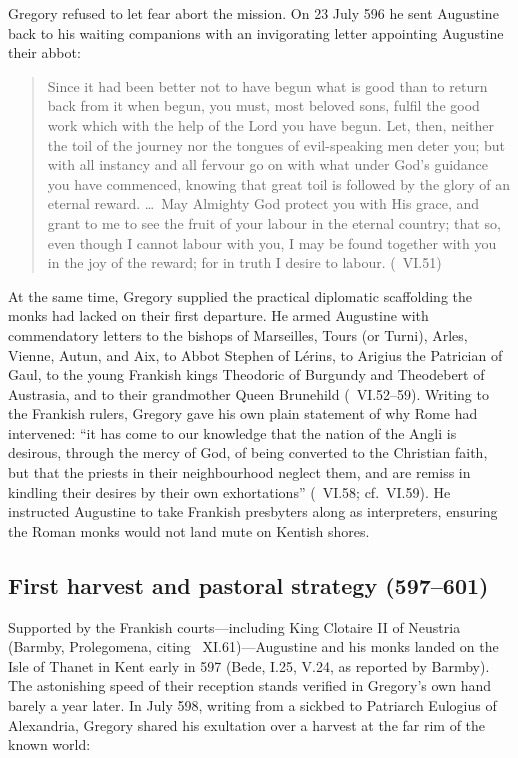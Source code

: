 Gregory refused to let fear abort the mission. On 23 July 596 he sent Augustine
back to his waiting companions with an invigorating letter appointing Augustine
their abbot:

\begin{quote}
Since it had been better not to have begun what is good than to return back
from it when begun, you must, most beloved sons, fulfil the good work which
with the help of the Lord you have begun. Let, then, neither the toil of the
journey nor the tongues of evil-speaking men deter you; but with all instancy
and all fervour go on with what under God's guidance you have commenced,
knowing that great toil is followed by the glory of an eternal reward. \dots\
May Almighty God protect you with His grace, and grant to me to see the fruit of
your labour in the eternal country; that so, even though I cannot labour with
you, I may be found together with you in the joy of the reward; for in truth I
desire to labour. (\work{Ep.}\ VI.51)
\end{quote}

At the same time, Gregory supplied the practical diplomatic scaffolding the
monks had lacked on their first departure. He armed Augustine with commendatory
letters to the bishops of Marseilles, Tours (or Turni), Arles, Vienne, Autun,
and Aix, to Abbot Stephen of L\'erins, to Arigius the Patrician of Gaul, to
the young Frankish kings Theodoric of Burgundy and Theodebert of Austrasia,
and to their grandmother Queen Brunehild (\work{Ep.}\ VI.52--59). Writing to
the Frankish rulers, Gregory gave his own plain statement of why Rome had
intervened: ``it has come to our knowledge that the nation of the Angli is
desirous, through the mercy of God, of being converted to the Christian faith,
but that the priests in their neighbourhood neglect them, and are remiss in
kindling their desires by their own exhortations'' (\work{Ep.}\ VI.58; cf.\
VI.59). He instructed Augustine to take Frankish presbyters along as
interpreters, ensuring the Roman monks would not land mute on Kentish shores.

\subsection{First harvest and pastoral strategy (597--601)}

Supported by the Frankish courts---including King Clotaire II of Neustria
(Barmby, Prolegomena, citing \ XI.61)---Augustine and his monks
landed on the Isle of Thanet in Kent early in 597 (Bede, \work{Historia
Ecclesiastica} I.25, V.24, as reported by Barmby). The astonishing speed of
their reception stands verified in Gregory's own hand barely a year later. In
July 598, writing from a sickbed to Patriarch Eulogius of Alexandria, Gregory
shared his exultation over a harvest at the far rim of the known world:


